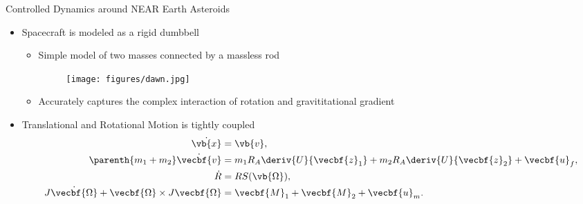 \documentclass[final, usenames, dvipsnames]{beamer}
\newlength{\twocolwidth}
\begin{document}
\begin{frame}[t]
\begin{columns}[T,onlytextwidth]
\begin{column}{\twocolwidth}
\begin{block}{Controlled Dynamics around NEAR Earth Asteroids} %
	\begin{minipage}{0.5\columnwidth} %
	\begin{itemize}
            \item Spacecraft is modeled as a rigid dumbbell
                \begin{itemize}
                    \item Simple model of two masses connected by a massless rod 
                        \begin{figure}
                            \centering
                            \texttt{[image: figures/dawn.jpg]}
                        \end{figure}
                    \item Accurately captures the complex interaction of rotation and gravititational gradient
                \end{itemize}
            \item Translational and Rotational Motion is tightly coupled
                \begin{align*}
                    \dot{\vb{x}} &= \vb{v}, \\
                    \parenth{m_1 + m_2} \dot{\vecbf{v}} &= m_1 R_A \deriv{U}{\vecbf{z}_1} + m_2 R_A \deriv{U}{\vecbf{z}_2} + \vecbf{u}_f, \\
                    \dot{R} &= R S(\vb{\Omega}) , \\
                    J \dot{\vecbf{\Omega}} + \vecbf{\Omega} \times J \vecbf{\Omega} &= \vecbf{M}_1 + \vecbf{M}_2 + \vecbf{u}_m. 
                \end{align*}


\end{itemize}
\end{minipage}
\end{block}
\end{column}
\end{columns}
\end{frame}
\end{document}
